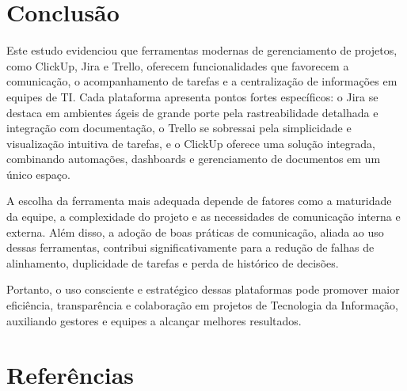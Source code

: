 \documentclass[12pt]{article}
\begin{document}
\section{Conclusão}
Este estudo evidenciou que ferramentas modernas de gerenciamento de projetos, como ClickUp, Jira e Trello, oferecem funcionalidades que favorecem a comunicação, o acompanhamento de tarefas e a centralização de informações em equipes de TI. Cada plataforma apresenta pontos fortes específicos: o Jira se destaca em ambientes ágeis de grande porte pela rastreabilidade detalhada e integração com documentação, o Trello se sobressai pela simplicidade e visualização intuitiva de tarefas, e o ClickUp oferece uma solução integrada, combinando automações, dashboards e gerenciamento de documentos em um único espaço.

A escolha da ferramenta mais adequada depende de fatores como a maturidade da equipe, a complexidade do projeto e as necessidades de comunicação interna e externa. Além disso, a adoção de boas práticas de comunicação, aliada ao uso dessas ferramentas, contribui significativamente para a redução de falhas de alinhamento, duplicidade de tarefas e perda de histórico de decisões.

Portanto, o uso consciente e estratégico dessas plataformas pode promover maior eficiência, transparência e colaboração em projetos de Tecnologia da Informação, auxiliando gestores e equipes a alcançar melhores resultados.



\clearpage
\section*{Referências}
\end{document}
